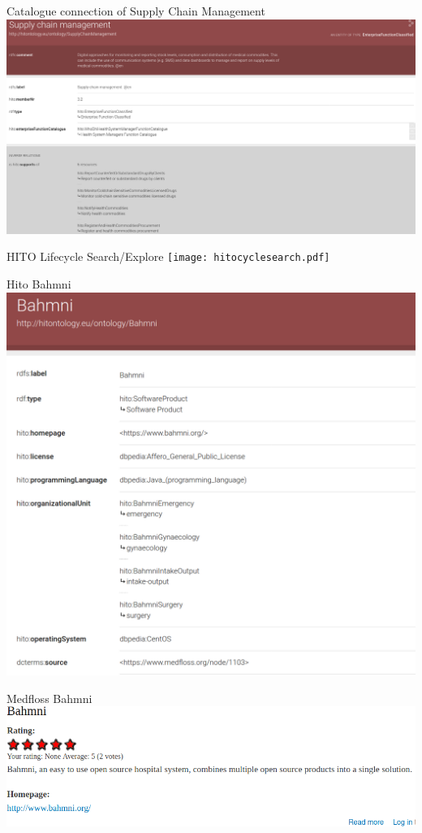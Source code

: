 \documentclass[aspectratio=1610,12pt]{beamer}
\begin{document}
\begin{frame}{Catalogue connection of Supply Chain Management}
\includegraphics[width=\textwidth]{img/supplychainmanagement.png}
\end{frame}

\begin{frame}{HITO Lifecycle Search/Explore}
  \centering
  \vspace{-0.5cm}
  \texttt{[image: hitocyclesearch.pdf]}
\end{frame}


\begin{frame}{Hito Bahmni}
  \includegraphics[width=\textwidth]{img/hito-bahmni.png}
\end{frame}

\begin{frame}{Medfloss Bahmni}
  \includegraphics[width=\textwidth]{img/medfloss-bahmni.png}
\end{frame}
\end{document}
